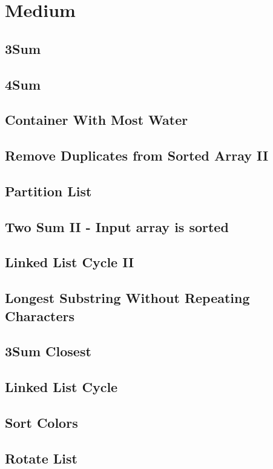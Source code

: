 \documentclass[12pt]{book}
\begin{document}
\section{Medium}
\label{sec-15-2}
\subsection{3Sum}
\label{sec-15-2-1}
\subsection{4Sum}
\label{sec-15-2-2}
\subsection{Container With Most Water}
\label{sec-15-2-3}
\subsection{Remove Duplicates from Sorted Array II}
\label{sec-15-2-4}
\subsection{Partition List}
\label{sec-15-2-5}
\subsection{Two Sum II - Input array is sorted}
\label{sec-15-2-6}
\subsection{Linked List Cycle II}
\label{sec-15-2-7}
\subsection{Longest Substring Without Repeating Characters}
\label{sec-15-2-8}
\subsection{3Sum Closest}
\label{sec-15-2-9}
\subsection{Linked List Cycle}
\label{sec-15-2-10}
\subsection{Sort Colors}
\label{sec-15-2-11}
\subsection{Rotate List}
\label{sec-15-2-12}
\end{document}
